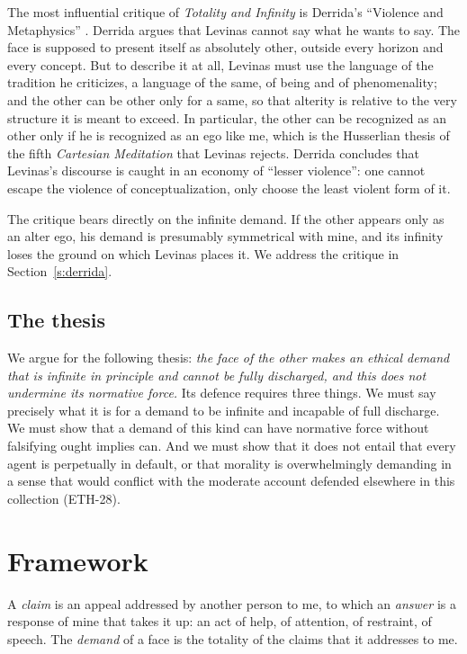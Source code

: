 \documentclass{situationist-preprint}
\begin{document}
The most influential critique of \emph{Totality and Infinity} is Derrida's \enquote{Violence and Metaphysics} \citep{Derrida1967}. Derrida argues that Levinas cannot say what he wants to say. The face is supposed to present itself as absolutely other, outside every horizon and every concept. But to describe it at all, Levinas must use the language of the tradition he criticizes, a language of the same, of being and of phenomenality; and the other can be other only for a same, so that alterity is relative to the very structure it is meant to exceed. In particular, the other can be recognized as an other only if he is recognized as an ego like me, which is the Husserlian thesis of the fifth \emph{Cartesian Meditation} that Levinas rejects. Derrida concludes that Levinas's discourse is caught in an economy of \enquote{lesser violence}: one cannot escape the violence of conceptualization, only choose the least violent form of it.

The critique bears directly on the infinite demand. If the other appears only as an alter ego, his demand is presumably symmetrical with mine, and its infinity loses the ground on which Levinas places it. We address the critique in Section~\ref{s:derrida}.

\subsection{The thesis}

We argue for the following thesis: \emph{the face of the other makes an ethical demand that is infinite in principle and cannot be fully discharged, and this does not undermine its normative force.} Its defence requires three things. We must say precisely what it is for a demand to be infinite and incapable of full discharge. We must show that a demand of this kind can have normative force without falsifying ought implies can. And we must show that it does not entail that every agent is perpetually in default, or that morality is overwhelmingly demanding in a sense that would conflict with the moderate account defended elsewhere in this collection (ETH-28).

\section{Framework}\label{s:framework}

\begin{definition}\label{d:claim}
A \emph{claim} is an appeal addressed by another person to me, to which an \emph{answer} is a response of mine that takes it up: an act of help, of attention, of restraint, of speech. The \emph{demand} of a face is the totality of the claims that it addresses to me.
\end{definition}
\end{document}
